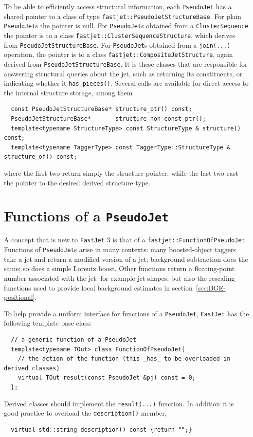 \documentclass[12pt,a4]{article}
\newcommand{\fastjet}{\texttt{FastJet}\xspace}
\newcommand{\ttt}[1]{{\small\texttt{#1}}}
\newcommand{\PseudoJet}{\ttt{PseudoJet}\xspace}
\newcommand{\PJ}{\ttt{PseudoJet}\xspace}
\newcommand{\CS}{\ttt{ClusterSequence}\xspace}
\begin{document}
To be able to efficiently access structural information, each \PJ has
a shared pointer to a class of type \ttt{fastjet::PseudoJetStructureBase}.
%
For plain {\PJ}s the pointer is null.
%
For {\PJ}s obtained from a \CS the pointer is to a class
\ttt{fastjet::ClusterSequenceStructure}, which derives from
\ttt{PseudoJetStructureBase}.
%
For {\PJ}s obtained from a \ttt{join(...)} operation, the pointer is
to a class \ttt{fastjet::CompositeJetStructure}, again derived from
\ttt{PseudoJetStructureBase}.
%
It is these classes that are responsible for answering structural
queries about the jet, such as returning its constituents, or
indicating whether it \ttt{has\_pieces()}.
%
Several calls are available for direct access to the internal structure
storage, among them
\begin{lstlisting}
  const PseudoJetStructureBase* structure_ptr() const;
  PseudoJetStructureBase*       structure_non_const_ptr();
  template<typename StructureType> const StructureType & structure() const;
  template<typename TaggerType> const TaggerType::StructureType & structure_of() const;
\end{lstlisting}
where the first two return simply the structure pointer, while the
last two cast the pointer to the desired derived structure type.



\section{Functions of a \texttt{PseudoJet}}
\label{app:function-of-pj}

A concept that is new to \fastjet 3 is that of a
\ttt{fastjet::FunctionOfPseudoJet}.
%
Functions of \ttt{PseudoJet}s arise in many contexts: many
boosted-object taggers take a jet and return a modified version of a
jet; background subtraction does the same; so does a simple Lorentz
boost.
%
Other functions return a floating-point number associated
with the jet: for example jet shapes, but also the rescaling functions
used to provide local background estimates in
section~\ref{sec:BGE-positional}.
%

To help provide a uniform interface for functions of a \PseudoJet,
\fastjet has the following template base class:
\begin{lstlisting}
  // a generic function of a PseudoJet
  template<typename TOut> class FunctionOfPseudoJet{
    // the action of the function (this _has_ to be overloaded in derived classes)
    virtual TOut result(const PseudoJet &pj) const = 0;
  };
\end{lstlisting}
Derived classes should implement the \ttt{result(...)} function. 
%
In addition it is good practice to overload the \ttt{description()}
member,
\begin{lstlisting}
  virtual std::string description() const {return "";}
\end{lstlisting}
\end{document}
